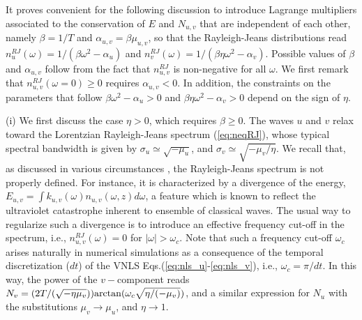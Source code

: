 \documentclass[pra,twocolumn,showpacs,preprintnumbers,amsmath,amssymb]{revtex4}
\begin{document}
It proves convenient for the following discussion to introduce Lagrange multipliers associated to the conservation of $E$ and $N_{u,v}$ that are independent of each other, namely $\beta=1/T$ and ${\alpha}_{u,v}=\beta \mu_{u,v}$, so that the Rayleigh-Jeans distributions read ${n}_u^{RJ}(\omega)=1/(\beta\omega^2 - {\alpha}_u)$ and 
${n}_v^{RJ}(\omega)=1/(\beta\eta \omega^2 - {\alpha}_v)$.
Possible values of $\beta$ and ${\alpha}_{u,v}$ follow from the fact that ${n}_{u,v}^{RJ}$ is non-negative for all $\omega$. 
We first remark that ${n}_{u,v}^{RJ}(\omega=0)\ge 0$ requires ${\alpha}_{u,v}< 0$. In addition, the constraints on the parameters that follow $\beta\omega^2 - {\alpha}_u>0$ and $\beta\eta \omega^2 - {\alpha}_v>0$ depend on the sign of $\eta$.

(i) We first discuss the case $\eta>0$, which requires $\beta\ge 0$. 
The waves $u$ and $v$ relax toward the Lorentzian Rayleigh-Jeans  spectrum (\ref{eq:neqRJ}), whose typical spectral bandwidth is given by $\sigma_u \simeq \sqrt{-\mu_u}$, and $\sigma_v \simeq \sqrt{-\mu_v/\eta}$.
We recall that, as discussed in various circumstances \cite{PR14}, the Rayleigh-Jeans  spectrum is not properly defined.
For instance, it is characterized by a divergence of the energy, $E_{u,v} = \int k_{u,v}(\omega) n_{u,v}(\omega,z) d\omega$, a feature which is known to reflect the ultraviolet catastrophe inherent to ensemble of classical waves.
The usual way to regularize such a divergence is to introduce an effective frequency cut-off in the spectrum, i.e., $n_{u,v}^{RJ}(\omega) = 0$ for $|\omega| > \omega_c$. 
Note that such a frequency cut-off $\omega_c$ arises naturally in numerical simulations as a consequence of the temporal discretization ($dt$) of the VNLS Eqs.(\ref{eq:nls_u}-\ref{eq:nls_v}), i.e., $\omega_c = \pi/ dt$.
In this way, the power of the $v-$component reads $N_v=(2 T /(\sqrt{-\eta \mu_v})) {\rm arctan}(\omega_c \sqrt{\eta/(-\mu_v)})$, and a similar expression for $N_u$ with the substitutions $\mu_v \to \mu_u$, and $\eta \to 1$.
\end{document}
